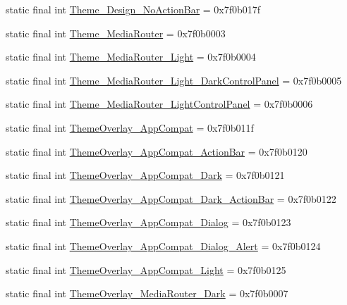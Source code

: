 \begin{CompactItemize}
static final int \hyperlink{classandroid_1_1support_1_1transition_1_1_r_1_1style_ce92e6cfd1b59b5abb30999b74acea83}{Theme\_\-Design\_\-NoActionBar} = 0x7f0b017f
\item 
static final int \hyperlink{classandroid_1_1support_1_1transition_1_1_r_1_1style_4941e41a7e33834542539914d9e3d809}{Theme\_\-MediaRouter} = 0x7f0b0003
\item 
static final int \hyperlink{classandroid_1_1support_1_1transition_1_1_r_1_1style_26b34bbe1804d7f75f35c304b02af909}{Theme\_\-MediaRouter\_\-Light} = 0x7f0b0004
\item 
static final int \hyperlink{classandroid_1_1support_1_1transition_1_1_r_1_1style_f7892fd39fb33e101476b5cde0aeb1d8}{Theme\_\-MediaRouter\_\-Light\_\-DarkControlPanel} = 0x7f0b0005
\item 
static final int \hyperlink{classandroid_1_1support_1_1transition_1_1_r_1_1style_5d04c16dcd10c2da8fc4aa2cd0df0ced}{Theme\_\-MediaRouter\_\-LightControlPanel} = 0x7f0b0006
\item 
static final int \hyperlink{classandroid_1_1support_1_1transition_1_1_r_1_1style_69dd06e22f6436dac8d2eb4145ba423b}{ThemeOverlay\_\-AppCompat} = 0x7f0b011f
\item 
static final int \hyperlink{classandroid_1_1support_1_1transition_1_1_r_1_1style_6f65ab681d388f4b6b3dbdfc9a19f0e8}{ThemeOverlay\_\-AppCompat\_\-ActionBar} = 0x7f0b0120
\item 
static final int \hyperlink{classandroid_1_1support_1_1transition_1_1_r_1_1style_3a2f4d056a04730f53bfe403a67dcc83}{ThemeOverlay\_\-AppCompat\_\-Dark} = 0x7f0b0121
\item 
static final int \hyperlink{classandroid_1_1support_1_1transition_1_1_r_1_1style_aece60772ad271246c4c094aaa7bf36f}{ThemeOverlay\_\-AppCompat\_\-Dark\_\-ActionBar} = 0x7f0b0122
\item 
static final int \hyperlink{classandroid_1_1support_1_1transition_1_1_r_1_1style_7af59b5de5fd0eb79e5ddc83a53298be}{ThemeOverlay\_\-AppCompat\_\-Dialog} = 0x7f0b0123
\item 
static final int \hyperlink{classandroid_1_1support_1_1transition_1_1_r_1_1style_af5a4fde9f8f9d9e0019f697856f9585}{ThemeOverlay\_\-AppCompat\_\-Dialog\_\-Alert} = 0x7f0b0124
\item 
static final int \hyperlink{classandroid_1_1support_1_1transition_1_1_r_1_1style_177367e1d9d48758ffbd6be737c47782}{ThemeOverlay\_\-AppCompat\_\-Light} = 0x7f0b0125
\item 
static final int \hyperlink{classandroid_1_1support_1_1transition_1_1_r_1_1style_8d58557dbb56008fcfd9c7252916cd1d}{ThemeOverlay\_\-MediaRouter\_\-Dark} = 0x7f0b0007

\end{CompactItemize}
